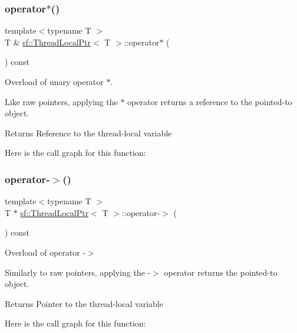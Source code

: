\subsubsection{\texorpdfstring{operator$\ast$()}{operator*()}}
{\footnotesize\ttfamily template$<$typename T $>$ \\
T \& \hyperlink{classsf_1_1_thread_local_ptr}{sf\+::\+Thread\+Local\+Ptr}$<$ T $>$\+::operator$\ast$ (\begin{DoxyParamCaption}{ }\end{DoxyParamCaption}) const}



Overload of unary operator $\ast$. 

Like raw pointers, applying the $\ast$ operator returns a reference to the pointed-\/to object.

\begin{DoxyReturn}{Returns}
Reference to the thread-\/local variable 
\end{DoxyReturn}
Here is the call graph for this function\+:
\mbox{\label{classsf_1_1_thread_local_ptr_a25646e1014a933d1a45b9ce17bab7703}} 
\subsubsection{\texorpdfstring{operator-\/$>$()}{operator->()}}
{\footnotesize\ttfamily template$<$typename T $>$ \\
T $\ast$ \hyperlink{classsf_1_1_thread_local_ptr}{sf\+::\+Thread\+Local\+Ptr}$<$ T $>$\+::operator-\/$>$ (\begin{DoxyParamCaption}{ }\end{DoxyParamCaption}) const}



Overload of operator -\/$>$ 

Similarly to raw pointers, applying the -\/$>$ operator returns the pointed-\/to object.

\begin{DoxyReturn}{Returns}
Pointer to the thread-\/local variable 
\end{DoxyReturn}
Here is the call graph for this function\+:
\mbox{\label{classsf_1_1_thread_local_ptr_a14dcf1cdf5f6b3bcdd633014b2b671f5}} 
